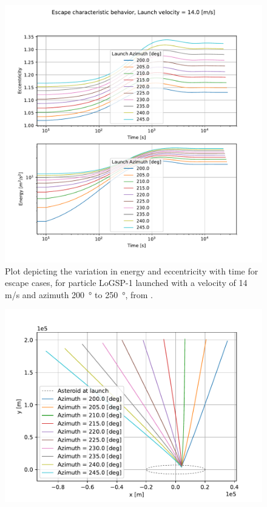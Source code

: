 \documentclass[print]{tudelft-report}
\begin{document}
\begin{appendices}
\begin{figure}[htb]
    \includegraphics[width=\textwidth, height=0.6\textheight, keepaspectratio=true]{Results/Images/leading_edge_perturbations/logsp1_escape_energy_ecc_14ms_200_to_250_azim_solarPhase225.pdf}
    \caption{Plot depicting the variation in energy and eccentricity with time for escape cases, for particle LoGSP-1 launched with a velocity of 14 m/s and azimuth \SI{200}{\degree} to \SI{250}{\degree}, from \protect{}.}
    \label{fig:leadingEdge_logsp1_escape_energy_ecc_14ms_200_250_azim_solar225}
    \end{figure}
    \FloatBarrier
    \begin{figure}[htb]
    \centering
    \captionsetup{justification=centering}
    \includegraphics[width=\textwidth, height=0.6\textheight, keepaspectratio=true]{Results/Images/leading_edge_perturbations/logsp1_escape_traj_14ms_200_to_250_azim_solarPhase225.pdf}

\end{figure}
\end{appendices}
\end{document}
